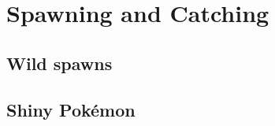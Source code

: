 \chapter{Spawning and Catching}
\label{chap:spawn}

\section{Wild spawns}
\label{section:spawns}

\section{Shiny Pokémon}
\label{section:shiny}
